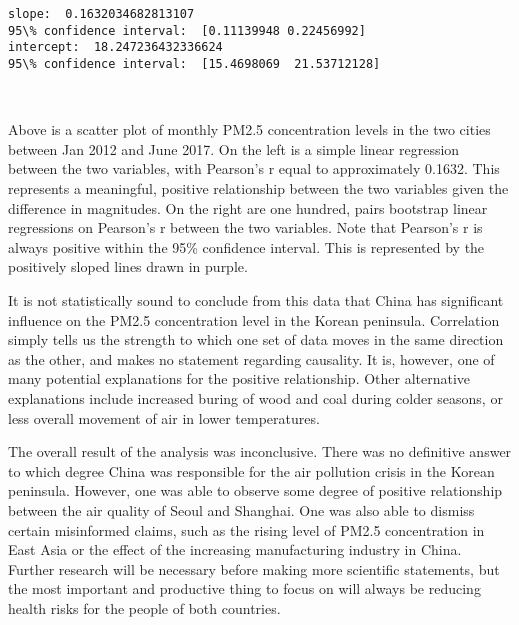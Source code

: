 \documentclass[11pt]{article}
\begin{document}
    \begin{Verbatim}[commandchars=\\\{\}]
slope:  0.1632034682813107
95\% confidence interval:  [0.11139948 0.22456992]
intercept:  18.247236432336624
95\% confidence interval:  [15.4698069  21.53712128]

    \end{Verbatim}

    \begin{center}
    \end{center}
    { \hspace*{\fill} \\}
    
    Above is a scatter plot of monthly PM2.5 concentration levels in the two
cities between Jan 2012 and June 2017. On the left is a simple linear
regression between the two variables, with Pearson's r equal to
approximately 0.1632. This represents a meaningful, positive
relationship between the two variables given the difference in
magnitudes. On the right are one hundred, pairs bootstrap linear
regressions on Pearson's r between the two variables. Note that
Pearson's r is always positive within the 95\% confidence interval. This
is represented by the positively sloped lines drawn in purple.

It is not statistically sound to conclude from this data that China has
significant influence on the PM2.5 concentration level in the Korean
peninsula. Correlation simply tells us the strength to which one set of
data moves in the same direction as the other, and makes no statement
regarding causality. It is, however, one of many potential explanations
for the positive relationship. Other alternative explanations include
increased buring of wood and coal during colder seasons, or less overall
movement of air in lower temperatures.

The overall result of the analysis was inconclusive. There was no
definitive answer to which degree China was responsible for the air
pollution crisis in the Korean peninsula. However, one was able to
observe some degree of positive relationship between the air quality of
Seoul and Shanghai. One was also able to dismiss certain misinformed
claims, such as the rising level of PM2.5 concentration in East Asia or
the effect of the increasing manufacturing industry in China. Further
research will be necessary before making more scientific statements, but
the most important and productive thing to focus on will always be
reducing health risks for the people of both countries.


    
    
    
    
\end{document}
